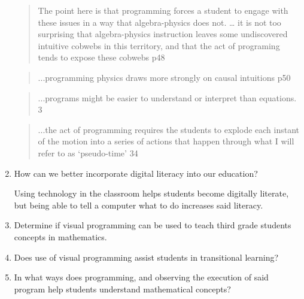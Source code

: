 \begin{enumerate}
	\begin{quotation}
			The point here is that programming forces a student to engage with these issues in a way that algebra-physics does not. … it is not too surprising that algebra-physics instruction leaves some undiscovered intuitive cobwebs in this territory, and that the act of programing tends to expose these cobwebs 	p48\cite{sherin}
	\end{quotation}
	\begin{quotation}
		...programming physics draws more strongly on causal intuitions	p50\cite{sherin}
	\end{quotation}
	\begin{quotation}
		...programs might be easier to understand or interpret than equations. 	3\cite{sherin}
	\end{quotation}
	\begin{quotation}
		...the act of programming requires the students to explode each instant of the motion into a series of actions that happen through what I will refer to as ‘pseudo-time’	34\cite{sherin}
	\end{quotation}

	\item How can we better incorporate digital literacy into our education?
    
    Using technology in the classroom helps students become digitally literate, but being able to tell a computer what to do increases said literacy. 
    
\item Determine if visual programming can be used to teach third grade students concepts in mathematics.
\item Does use of visual programming assist students in transitional learning?
\item In what ways does programming, and observing the execution of said program help students understand mathematical concepts?

\end{enumerate}
